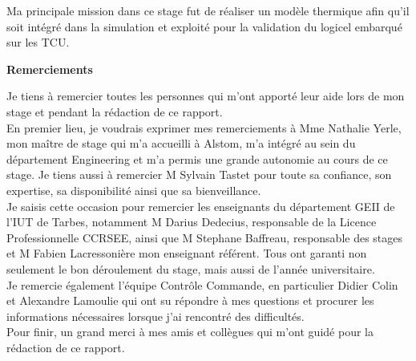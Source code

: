 \documentclass[a4paper]{report}
\begin{document}
		Ma principale mission dans ce stage fut de réaliser un modèle thermique afin qu'il soit intégré dans la simulation et exploité pour la validation du logicel embarqué sur les TCU.
		
		\vspace*{3cm}
		
		\begin{center}
			\textbf{Remerciements}
		\end{center}
	
		{\huge J}e tiens à remercier toutes les personnes qui m’ont apporté leur aide lors de mon stage et pendant la rédaction de ce rapport.\\

En premier lieu, je voudrais exprimer mes remerciements à Mme Nathalie Yerle, mon maître de stage qui m'a accueilli à Alstom, m'a intégré au sein du département Engineering et m'a permis une grande autonomie au cours de ce stage.
Je tiens aussi à remercier M Sylvain Tastet pour toute sa confiance, son expertise, sa disponibilité ainsi que sa bienveillance.\\

Je saisis cette occasion pour remercier les enseignants du département GEII de l'IUT de Tarbes, notamment M Darius Dedecius, responsable de la Licence Professionnelle CCRSEE, ainsi que M Stephane Baffreau, responsable des stages et M Fabien Lacressonière mon enseignant référent. Tous ont garanti non seulement le bon déroulement du stage, mais aussi de l'année universitaire.\\

Je remercie également l'équipe Contrôle Commande, en particulier Didier Colin et Alexandre Lamoulie qui ont su répondre à mes questions et procurer les informations nécessaires lorsque j'ai rencontré des difficultés.\\

Pour finir, un grand merci à mes amis et collègues qui m'ont guidé pour la rédaction de ce rapport.
		

	
	
\end{document}
